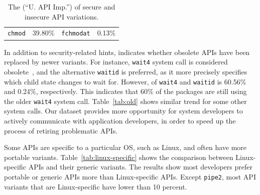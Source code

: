\begin{table}[t!b!]
\begin{tabular}{m{0.85in}rm{0.85in}r}
{\tt chmod}    & 39.80\% & {\tt fchmodat}   & 0.13\% \\
\end{tabular}
\caption{The \unwusagemetric{} (``U. API Imp.'') of secure and insecure API variations.}
\label{tab:security_api}
\end{table}


In addition to security-related hints, \unwusagemetric{}
indicates whether obsolete APIs have been replaced by newer variants.
For instance, {\tt wait4} system call is considered obsolete~\citep{wait4man},
and the alternative {\tt waitid} is preferred, as it more precisely specifies which child state changes to wait for. %
However, \unwusagemetric{} of {\tt wait4} and {\tt waitid} is 60.56\% and 0.24\%, respectively.
This indicates that 60\% of the packages are still using the older {\tt wait4} system call.
Table~\ref{tab:old} shows similar trend for some other system calls.
Our dataset provides more opportunity for system developers
to actively communicate with application developers,
in order to speed up the process of retiring problematic APIs. 


Some APIs are specific to a particular OS,
such as Linux,
and often have more portable variants.
Table~\ref{tab:linux-specific} shows the comparison between
Linux-specific APIs and their generic variants.
The results show most developers prefer portable or generic APIs
more than Linux-specific APIs.
Except {\tt pipe2}, most API variants that are Linux-specific
have \unwusagemetric{} lower than 10 percent.


